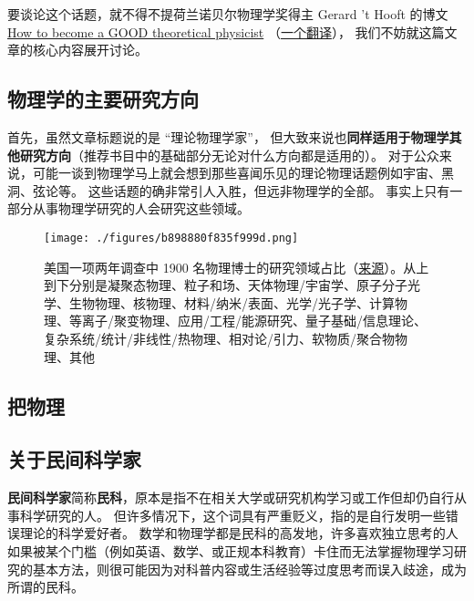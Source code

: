 
要谈论这个话题，就不得不提荷兰诺贝尔物理学奖得主 Gerard 't Hooft 的博文 \href{https://webspace.science.uu.nl/~hooft101/theorist.html}{How to become a GOOD theoretical physicist} （\href{https://xialab.pku.edu.cn/kytdyw1/zdylm.m.jsp?wbtreeid=1011&tstreeid=11956&_t_uid=2945&language=en&homepageuuid=BF649325C5584FC683CE0B601D21AC65&templateuuid=4CC182410BA14FF8B55ED726FB2087FB&producttype=0&_tmode_=99&tsitesapptype=zdylm}{一个翻译}）， 我们不妨就这篇文章的核心内容展开讨论。

\subsection{物理学的主要研究方向}
首先，虽然文章标题说的是 “理论物理学家”， 但大致来说也\textbf{同样适用于物理学其他研究方向}（推荐书目中的基础部分无论对什么方向都是适用的）。 对于公众来说，可能一谈到物理学马上就会想到那些喜闻乐见的理论物理话题例如宇宙、黑洞、弦论等。 这些话题的确非常引人入胜，但远非物理学的全部。 事实上只有一部分从事物理学研究的人会研究这些领域。

\begin{figure}[ht]
\centering
\texttt{[image: ./figures/b898880f835f999d.png]}
\caption{美国一项两年调查中 1900 名物理博士的研究领域占比（\href{https://ww2.aip.org/statistics/trends-in-physics-phds}{来源}）。从上到下分别是凝聚态物理、粒子和场、天体物理/宇宙学、原子分子光学、生物物理、核物理、材料/纳米/表面、光学/光子学、计算物理、等离子/聚变物理、应用/工程/能源研究、量子基础/信息理论、复杂系统/统计/非线性/热物理、相对论/引力、软物质/聚合物物理、其他} \label{fig_SdyPhy_1}
\end{figure}

\subsection{把物理}

\subsection{关于民间科学家}
\textbf{民间科学家}简称\textbf{民科}，原本是指不在相关大学或研究机构学习或工作但却仍自行从事科学研究的人。 但许多情况下，这个词具有严重贬义，指的是自行发明一些错误理论的科学爱好者。 数学和物理学都是民科的高发地，许多喜欢独立思考的人如果被某个门槛（例如英语、数学、或正规本科教育）卡住而无法掌握物理学习研究的基本方法，则很可能因为对科普内容或生活经验等过度思考而误入歧途，成为所谓的民科。

